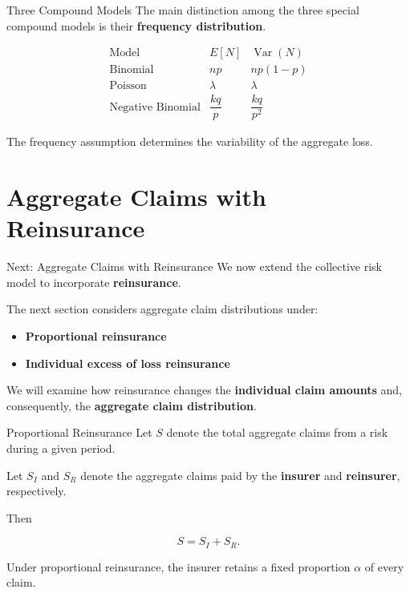 \documentclass[
  ignorenonframetext,
  aspectratio=169,
]{beamer}
\providecommand{\tightlist}{%
  \setlength{\itemsep}{0pt}\setlength{\parskip}{0pt}}
\begin{document}
\begin{frame}{Three Compound Models}
\protect{}\label{three-compound-models}
The main distinction among the three special compound models is their
\textbf{frequency distribution}.

\[
\begin{array}{c|c|c}
\text{Model} & E[N] & \operatorname{Var}(N)\\
\hline
\text{Binomial} & np & np(1-p)\\
\text{Poisson} & \lambda & \lambda\\
\text{Negative Binomial} & \dfrac{kq}{p} & \dfrac{kq}{p^2}
\end{array}
\]

The frequency assumption determines the variability of the aggregate
loss.
\end{frame}

\section{Aggregate Claims with
Reinsurance}\label{aggregate-claims-with-reinsurance}

\begin{frame}{Next: Aggregate Claims with Reinsurance}
\protect{}\label{next-aggregate-claims-with-reinsurance}
We now extend the collective risk model to incorporate
\textbf{reinsurance}.

The next section considers aggregate claim distributions under:

\begin{itemize}
\tightlist
\item
  \textbf{Proportional reinsurance}
\item
  \textbf{Individual excess of loss reinsurance}
\end{itemize}

We will examine how reinsurance changes the \textbf{individual claim
amounts} and, consequently, the \textbf{aggregate claim distribution}.
\end{frame}

\begin{frame}{Proportional Reinsurance}
\protect{}\label{proportional-reinsurance}
Let \(S\) denote the total aggregate claims from a risk during a given
period.

Let \(S_I\) and \(S_R\) denote the aggregate claims paid by the
\textbf{insurer} and \textbf{reinsurer}, respectively.

Then

\[
\boxed{S=S_I+S_R}.
\]

Under proportional reinsurance, the insurer retains a fixed proportion
\(\alpha\) of every claim.
\end{frame}
\end{document}
